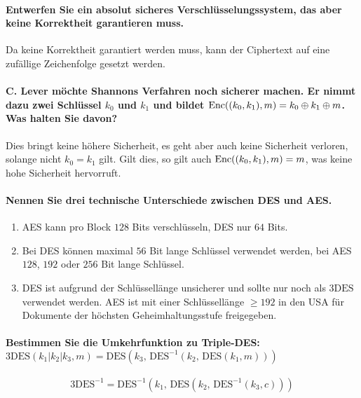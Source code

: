         \paragraph{Entwerfen Sie ein absolut sicheres Verschlüsselungssystem, das aber keine Korrektheit garantieren muss.}
        Da keine Korrektheit garantiert werden muss, kann der Ciphertext auf eine zufällige Zeichenfolge gesetzt werden.

        \paragraph{C. Lever möchte Shannons Verfahren noch sicherer machen. Er nimmt dazu zwei Schlüssel \(k_0\) und \(k_1\) und bildet \(\operatorname{Enc}((k_0, k_1), m) = k_0 \oplus k_1 \oplus m\). Was halten Sie davon?}
        Dies bringt keine höhere Sicherheit, es geht aber auch keine Sicherheit verloren, solange nicht \( k_0 = k_1 \) gilt. Gilt dies, so gilt auch \( \operatorname{Enc}((k_0, k_1), m) = m \), was keine hohe Sicherheit hervorruft.

        \paragraph{Nennen Sie drei technische Unterschiede zwischen DES und AES.}
        \begin{enumerate}
        	\item AES kann pro Block \(128\) Bits verschlüsseln, DES nur \(64\) Bits.
        	\item Bei DES können maximal \(56\) Bit lange Schlüssel verwendet werden, bei AES \(128\), \(192\) oder \(256\) Bit lange Schlüssel.
        	\item DES ist aufgrund der Schlüssellänge unsicherer und sollte nur noch als \(\textrm{3DES}\) verwendet werden. AES ist mit einer Schlüssellänge \( \geq 192 \) in den USA für Dokumente der höchsten Geheimhaltungsstufe freigegeben.
        \end{enumerate}
        
        \paragraph{Bestimmen Sie die Umkehrfunktion zu Triple-DES: \(\textrm{3DES}(k_1 \vert k_2 \vert k_3, m) = \textrm{DES}(k_3, \,\textrm{DES}^{-1}(k_2, \,\textrm{DES}(k_1, m)))\)}
        \begin{equation*}
	        \textrm{3DES}^{-1} = \textrm{DES}^{-1}(k_1, \,\textrm{DES}(k_2, \,\textrm{DES}^{-1}(k_3, c)))
        \end{equation*}
        
